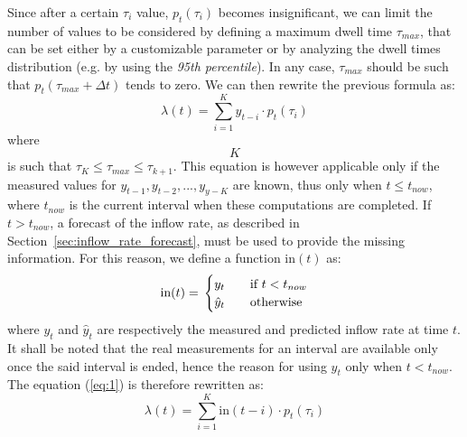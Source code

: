 Since after a certain \( \tau_i \) value, \( p_t(\tau_i) \) becomes insignificant, we can limit the number of values to be considered by defining a maximum dwell time \( \tau_{max} \), that can be set either by a customizable parameter or by analyzing the dwell times distribution (e.g. by using the \emph{95th percentile}). In any case, \( \tau_{max} \) should be such that \( p_t(\tau_{max} + \Delta t) \) tends to zero. We can then rewrite the previous formula as:
\begin{equation}
  \lambda(t) = \sum_{i=1}^{K} y_{t-i} \cdot p_t(\tau_i)
  \label{eq:1}
\end{equation}
where $$ K $$ is such that \( \tau_K \leq \tau_{max} \leq \tau_{k+1} \). This equation is however applicable only if the measured values for \( y_{t-1}, y_{t-2}, ..., y_{y-K} \) are known, thus only when \( t \leq t_{now} \), where \( t_{now} \) is the current interval when these computations are completed. If \( t > t_{now} \), a forecast of the inflow rate, as described in Section~\ref{sec:inflow_rate_forecast}, must be used to provide the missing information. For this reason, we define a function \( \text{in}(t) \) as:
\begin{equation}
  \text{in}(t) = \\
  \begin{cases}
    y_{t}       & \quad \text{if } t < t_{now} \\
    \hat{y}_{t} & \quad \text{otherwise}
  \end{cases}
\end{equation}
where \( y_t \) and \( \hat{y}_t \) are respectively the measured and predicted inflow rate at time \( t \). It shall be noted that the real measurements for an interval are available only once the said interval is ended, hence the reason for using \( y_t \) only when \( t < t_{now} \). The equation (\ref{eq:1}) is therefore rewritten as:
\begin{equation}
  \lambda(t) = \sum_{i=1}^{K} \text{in}(t-i) \cdot p_t(\tau_i)
\end{equation}

